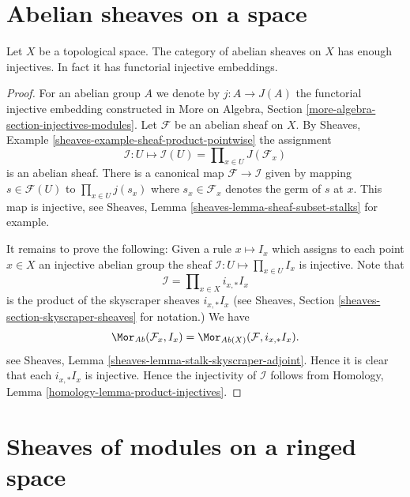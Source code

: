 \section{Abelian sheaves on a space}
\label{section-abelian-sheaves-space}


\begin{lemma}
\label{lemma-abelian-sheaves-space}
Let $X$ be a topological space.
The category of abelian sheaves on $X$ has enough injectives.
In fact it has functorial injective embeddings.
\end{lemma}

\begin{proof}
For an abelian group $A$ we denote by $j : A \to J(A)$ the functorial
injective embedding constructed in
More on Algebra, Section \ref{more-algebra-section-injectives-modules}.
Let $\mathcal{F}$ be an abelian sheaf on $X$.
By Sheaves, Example \ref{sheaves-example-sheaf-product-pointwise}
the assignment
$$
\mathcal{I} : U \mapsto
\mathcal{I}(U) = \prod\nolimits_{x\in U} J(\mathcal{F}_x)
$$
is an abelian sheaf. There is a canonical map $\mathcal{F} \to \mathcal{I}$
given by mapping $s \in \mathcal{F}(U)$ to $\prod_{x \in U} j(s_x)$
where $s_x \in \mathcal{F}_x$ denotes the germ of $s$ at $x$.
This map is injective, see
Sheaves, Lemma \ref{sheaves-lemma-sheaf-subset-stalks}
for example.

\medskip\noindent
It remains to prove the following: Given a rule
$x \mapsto I_x$ which assigns to each point $x \in X$ an injective
abelian group the sheaf $\mathcal{I} : U \mapsto \prod_{x \in U} I_x$
is injective. Note that
$$
\mathcal{I} = \prod\nolimits_{x \in X} i_{x, *}I_x
$$
is the product of the skyscraper sheaves $i_{x, *}I_x$ (see
Sheaves, Section \ref{sheaves-section-skyscraper-sheaves} for notation.)
We have
$$
\Mor_{\textit{Ab}}(\mathcal{F}_x, I_x)
=
\Mor_{\textit{Ab}(X)}(\mathcal{F}, i_{x, *}I_x).
$$
see Sheaves, Lemma \ref{sheaves-lemma-stalk-skyscraper-adjoint}. Hence it is
clear that each $i_{x, *}I_x$ is injective. Hence the injectivity of
$\mathcal{I}$ follows from
Homology, Lemma \ref{homology-lemma-product-injectives}.
\end{proof}









\section{Sheaves of modules on a ringed space}
\label{section-sheaves-modules-space}


